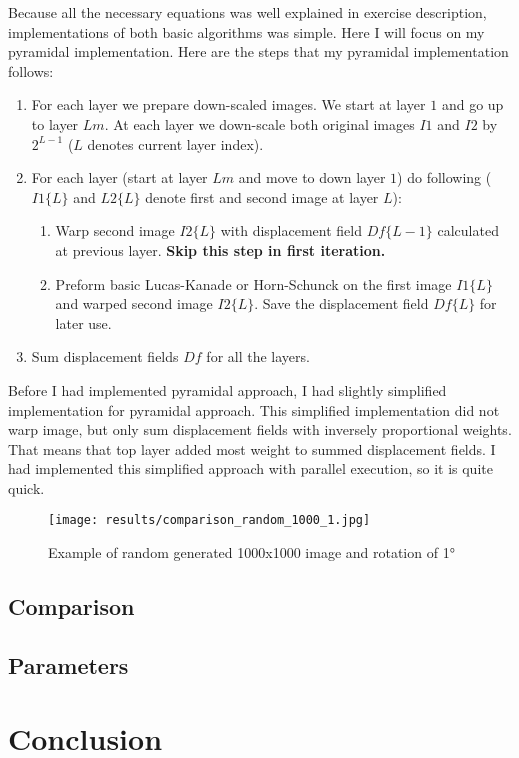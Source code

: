 \documentclass[runningheads]{llncs}
\begin{document}
Because all the necessary equations was well explained in exercise description, implementations of both basic algorithms was simple. Here I will focus on my pyramidal implementation. \newpage Here are the steps that my pyramidal implementation follows:

\begin{enumerate}
    \item For each layer we prepare down-scaled images. We start at layer $1$ and go up to layer $Lm$. At each layer we down-scale both original images $I1$ and $I2$ by $2^{L-1}$ ($L$ denotes current layer index).
    \item For each layer (start at layer $Lm$ and move to down layer $1$) do following ($I1\{L\}$ and $L2\{L\}$ denote first and second image at layer $L$):
    \begin{enumerate}
        \item Warp second image $I2\{L\}$ with displacement field $Df\{L-1\}$ calculated at previous layer. \textbf{Skip this step in first iteration.}
        \item Preform basic Lucas-Kanade or Horn-Schunck on the first image $I1\{L\}$ and warped second image $I2\{L\}$. Save the  displacement field $Df\{L\}$ for later use.
    \end{enumerate}
    \item Sum displacement fields $Df$  for all the layers.
\end{enumerate}

Before I had implemented pyramidal approach, I had slightly simplified implementation for pyramidal approach. This simplified implementation did not warp image, but only sum displacement fields with inversely proportional weights. That means that top layer added most weight to summed displacement fields. I had implemented this simplified approach with parallel execution, so it is quite quick.

\begin{figure}[ht!]
\centering
\texttt{[image: results/comparison\_random\_1000\_1.jpg]}
\caption{Example of random generated 1000x1000 image and rotation of \ang{1} \label{img_0}}
\end{figure}

\subsection{Comparison}

\subsection{Parameters}

\section{Conclusion}
\end{document}
